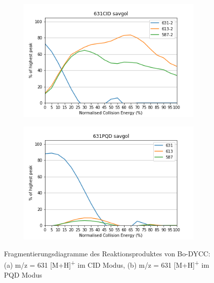 \begin{figure}[!htbp]
  \begin{subfigure}[b]{0.5\textwidth}
    \includegraphics[width=\textwidth]{content/Anhang/ESIMS/RP_Bo-DYCC/631CID-631-2savgol.png}
    \caption{}
  \end{subfigure}
  \hfill
  \begin{subfigure}[b]{0.5\textwidth}
    \includegraphics[width=\textwidth]{content/Anhang/ESIMS/RP_Bo-DYCC/631PQD-631savgol.png}
    \caption{}
  \end{subfigure}
  
  \caption[Fragmentierungsdiagramme des Reaktionsproduktes von Bo-DYCC, Quelle: Autor]{Fragmentierungsdiagramme des Reaktionsproduktes von Bo-DYCC: (a) m/z = 631 [M+H]\textsuperscript{+} im CID Modus, (b) m/z = 631 [M+H]\textsuperscript{+} im PQD Modus}
\end{figure}

